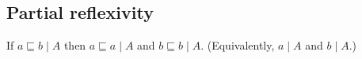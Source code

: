 \documentclass{article}
\newcommand{\ale}{\sqsubseteq}
\newcommand{\step}{\mapsto}
\newcommand{\steps}{\step^*}
\newcommand{\lr}[2]{#2\mathrel{|}#1}
\begin{document}
    
    
    
    


\subsection{Partial reflexivity}
\begin{theorem}\label{thm:prefl}
  If $\lr{A}{a \ale b}$ then $\lr{A}{a \ale a}$ and $\lr{A}{b \ale b}$.
  (Equivalently, $\lr{A}{a}$ and $\lr{A}{b}$.)
\end{theorem}
\end{document}
